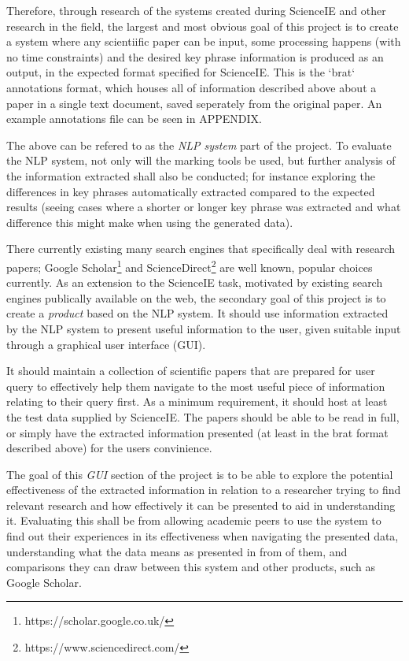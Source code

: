 Therefore, through research of the systems created during ScienceIE and other research in the field, the largest and most obvious goal of this project is to create a system where any scientiific paper can be input, some processing happens (with no time constraints) and the desired key phrase information is produced as an output, in the expected format specified for ScienceIE. This is the `brat` annotations format, which houses all of information described above about a paper in a single text document, saved seperately from the original paper. An example annotations file can be seen in APPENDIX.

The above can be refered to as the \textit{NLP system} part of the project. To evaluate the NLP system, not only will the marking tools be used, but further analysis of the information extracted shall also be conducted; for instance exploring the differences in key phrases automatically extracted compared to the expected results (seeing cases where a shorter or longer key phrase was extracted and what difference this might make when using the generated data).

There currently existing many search engines that specifically deal with research papers; Google Scholar\footnote{https://scholar.google.co.uk/} and ScienceDirect\footnote{https://www.sciencedirect.com/} are well known, popular choices currently. As an extension to the ScienceIE task, motivated by existing search engines publically available on the web, the secondary goal of this project is to create a \textit{product} based on the NLP system. It should use information extracted by the NLP system to present useful information to the user, given suitable input through a graphical user interface (GUI).

It should maintain a collection of scientific papers that are prepared for user query to effectively help them navigate to the most useful piece of information relating to their query first. As a minimum requirement, it should host at least the test data supplied by ScienceIE. The papers should be able to be read in full, or simply have the extracted information presented (at least in the brat format described above) for the users convinience.

The goal of this \textit{GUI} section of the project is to be able to explore the potential effectiveness of the extracted information in relation to a researcher trying to find relevant research and how effectively it can be presented to aid in understanding it. Evaluating this shall be from allowing academic peers to use the system to find out their experiences in its effectiveness when navigating the presented data, understanding what the data means as presented in from of them, and comparisons they can draw between this system and other products, such as Google Scholar.

